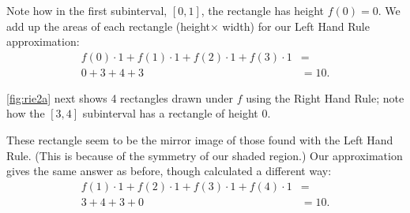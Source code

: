 \begin{example}
Note how in the first subinterval, $[0,1]$, the rectangle has height $f(0)=0$. We add up the areas of each rectangle (height$\times$ width) for our Left Hand Rule approximation:
\begin{align*}
 f(0)\cdot 1 + f(1)\cdot 1+ f(2)\cdot 1+f(3)\cdot 1 &=\\
	0+3+4+3&= 10.
\end{align*}
	
\autoref{fig:rie2a} next shows 4 rectangles drawn under $f$ using the Right Hand Rule; note how the $[3,4]$ subinterval has a rectangle of height 0. 


These rectangle seem to be the mirror image of those found with the Left Hand Rule. (This is because of the symmetry of our shaded region.) Our approximation gives the same answer as before, though calculated a different way:
\begin{align*}
 f(1)\cdot 1 + f(2)\cdot 1+ f(3)\cdot 1+f(4)\cdot 1 &=\\
	3+4+3+0&= 10.
\end{align*}


\end{example}
